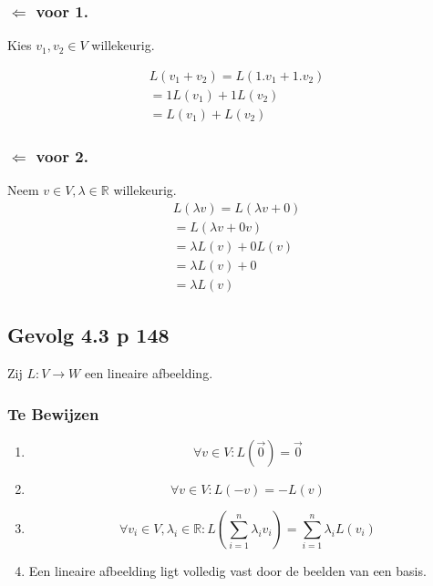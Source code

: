 \documentclass[lineaire_algebra_oplossingen.tex]{subfiles}
\begin{document}
\subsubsection*{$\Leftarrow$ voor 1.}
Kies $v_1,v_2 \in V$ willekeurig.

\begin{align*}
L(v_1 + v_2) = L(1.v_1+1.v_2) \tag{co\"effici\"ent 1 in V}\\
=1L(v_1)+1L(v_2) \tag{wegens 3.}\\
=L(v_1)+L(v_2) \tag{co\"effici\"ent 1 in W}
\end{align*}

\subsubsection*{$\Leftarrow$ voor 2.}
Neem $v\in V, \lambda \in \mathbb{R}$ willekeurig.
\begin{align*}
L(\lambda v)=L(\lambda v + 0) \tag{neutraal element in V}\\
=L(\lambda v + 0v)\tag{Lemma 3.8}\\
=\lambda L(v) + 0 L(v) \tag{wegens 3.}\\
=\lambda L(v) + 0 \tag{Lemma 3.8 in W}\\
=\lambda L(v) \tag{neutraal element in W}
\end{align*}


\subsection{Gevolg 4.3 p 148}
\label{4.3}
Zij $L:V\rightarrow W$ een lineaire afbeelding.

\subsubsection*{Te Bewijzen}
\begin{enumerate}
\item
\[\forall v \in V: L(\vec{0})=\vec{0}\]
\item
\[\forall v \in V: L(-v)=-L(v)\]
\item
\[\forall v_i\in V, \lambda_i \in \mathbb{R}: L\left(\sum_{i=1}^n\lambda_iv_i\right) = \sum_{i=1}^n\lambda_iL(v_i)\]
\item
Een lineaire afbeelding ligt volledig vast door de beelden van een basis.
\end{enumerate}
\end{document}
